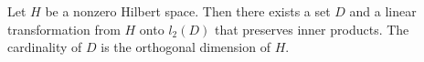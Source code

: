Let $H$ be a nonzero Hilbert space. Then there exists a set $D$ and a linear transformation from $H$ onto $l_2(D)$ that preserves inner products. The cardinality of $D$ is the orthogonal dimension of $H$.
